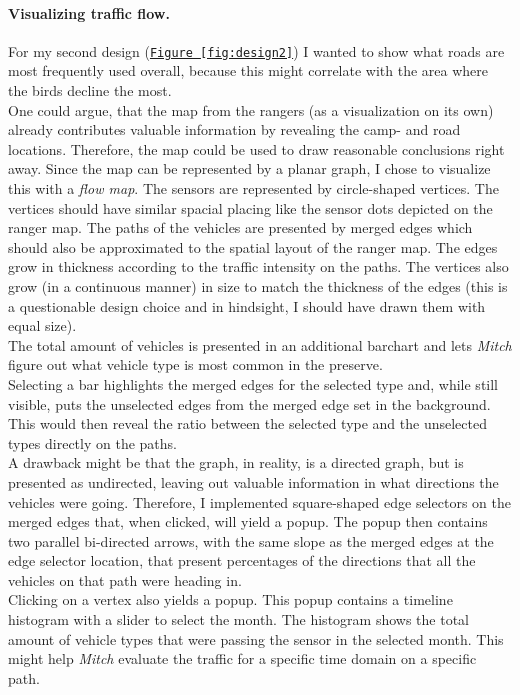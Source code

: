 \documentclass{article}
\begin{document}
\paragraph*{Visualizing traffic flow.}
For my second design (\texttt{\hyperref[fig:design2]{Figure~\ref{fig:design2}}}) I wanted to show what roads are most frequently used overall, because this might correlate with the area where the birds decline the most.\\
One could argue, that the map from the rangers (as a visualization on its own) already contributes valuable information by revealing the camp- and road locations. Therefore, the map could be used to draw reasonable conclusions right away.
Since the map can be represented by a planar graph, I chose to visualize this with a \textit{flow map}. The sensors are represented by circle-shaped vertices. The vertices should have similar spacial placing like the sensor dots depicted on the ranger map. The paths of the vehicles are presented by merged edges which should also be approximated to the spatial layout of the ranger map. The edges grow in thickness according to the traffic intensity on the paths. The vertices also grow (in a continuous manner) in size to match the thickness of the edges (this is a questionable design choice and in hindsight, I should have drawn them with equal size).\\
The total amount of vehicles is presented in an additional barchart and lets \textit{Mitch} figure out what vehicle type is most common in the preserve.\\
Selecting a bar highlights the merged edges for the selected type and, while still visible, puts the unselected edges from the merged edge set in the background. This would then reveal the ratio between the selected type and the unselected types directly on the paths.\\
A drawback might be that the graph, in reality, is a directed graph, but is presented as undirected, leaving out valuable information in what directions the vehicles were going. Therefore, I implemented square-shaped edge selectors on the merged edges that, when clicked, will yield a popup. The popup then contains two parallel bi-directed arrows, with the same slope as the merged edges at the edge selector location, that present percentages of the directions that all the vehicles on that path were heading in.\\
Clicking on a vertex also yields a popup. This popup contains a timeline histogram with a slider to select the month. The histogram shows the total amount of vehicle types that were passing the sensor in the selected month. This might help \textit{Mitch} evaluate the traffic for a specific time domain on a specific path.\\
\end{document}
